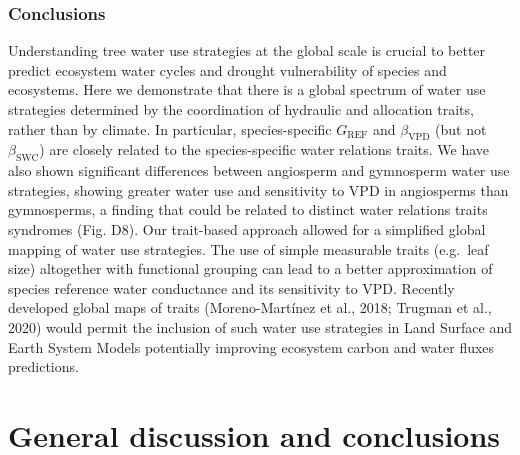 \documentclass[11pt,twoside]{reedthesis}
\begin{document}
\subsection{Conclusions}\label{conclusions}

Understanding tree water use strategies at the global scale is crucial
to better predict ecosystem water cycles and drought vulnerability of
species and ecosystems. Here we demonstrate that there is a global
spectrum of water use strategies determined by the coordination of
hydraulic and allocation traits, rather than by climate. In particular,
species-specific \(G_{\text{REF}}\) and \(\beta_{\text{VPD}}\) (but not
\(\beta_{\text{SWC}}\)) are closely related to the species-specific
water relations traits. We have also shown significant differences
between angiosperm and gymnosperm water use strategies, showing greater
water use and sensitivity to VPD in angiosperms than gymnosperms, a
finding that could be related to distinct water relations traits
syndromes (Fig. D8). Our trait-based approach allowed for a simplified
global mapping of water use strategies. The use of simple measurable
traits (e.g.~leaf size) altogether with functional grouping can lead to
a better approximation of species reference water conductance and its
sensitivity to VPD. Recently developed global maps of traits
(Moreno-Martínez et al., 2018; Trugman et al., 2020) would permit the
inclusion of such water use strategies in Land Surface and Earth System
Models potentially improving ecosystem carbon and water fluxes
predictions.\par

\chapter[General discussion and conclusions]{General discussion and conclusions}

\setlength{\parskip}{0.2cm plus4mm minus3mm}

\newpage
\end{document}
